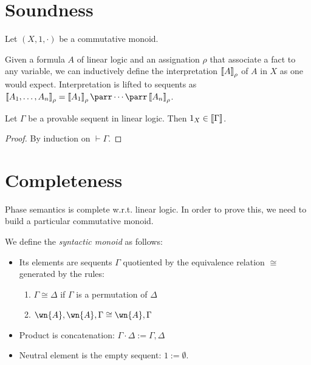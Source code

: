 \section{Soundness}\label{soundness}

\begin{definition}
Let $(X, 1, \cdot)$ be a commutative monoid.

Given a formula $A$ of linear logic and an assignation $\rho$ that associate a fact to any variable, we can inductively define the interpretation $\left\llbracket A\right\rrbracket_\rho$ of $A$ in $X$ as one would expect. Interpretation is lifted to sequents as $\sem{A_1, \dots, A_n}_\rho = \sem{A_1}_\rho \parr \cdots \parr \sem{A_n}_\rho$.
\end{definition}

\begin{theorem}
Let $\Gamma$ be a provable sequent in linear logic. Then $1_X \in \left\llbracket \Gamma\right\rrbracket$.
\end{theorem}

\begin{proof}
By induction on $\vdash\Gamma$.
\end{proof}

\section{Completeness}\label{completeness}

Phase semantics is complete w.r.t. linear logic. In order to prove this,
we need to build a particular commutative monoid.

\begin{definition}
We define the \emph{syntactic monoid} as follows:
\begin{itemize}
\item Its elements are sequents $\Gamma$ quotiented by the equivalence relation $\cong$ generated by the rules:
\begin{enumerate}
\item $\Gamma \cong \Delta$ if $\Gamma$ is a permutation of $\Delta$
\item $\wn{A}, \wn{A}, \Gamma \cong \wn{A}, \Gamma$
\end{enumerate}
\item Product is concatenation: $\Gamma \cdot \Delta := \Gamma, \Delta$
\item Neutral element is the empty sequent: $1 := \emptyset$.
\end{itemize}
\end{definition}

